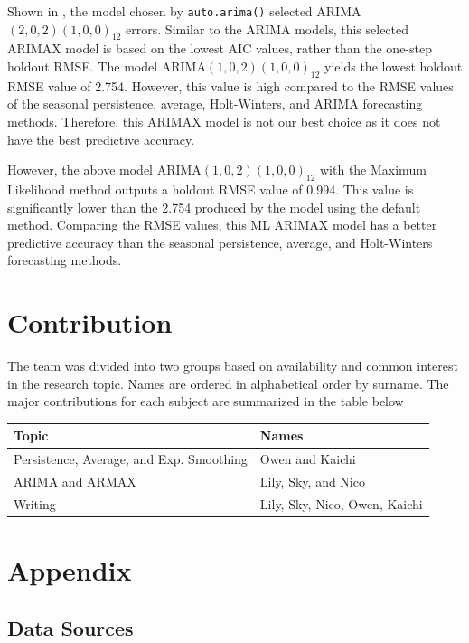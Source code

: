 \documentclass[]{article}
\begin{document}
Shown in , the model chosen by \texttt{auto.arima()} selected ARIMA$(2,0,2)(1,0,0)_12$ errors. Similar to the ARIMA models, this selected ARIMAX model is based on the lowest AIC values, rather than the one-step holdout RMSE. The model ARIMA$(1,0,2)(1,0,0)_12$ yields the lowest holdout RMSE value of 2.754. However, this value is high compared to the RMSE values of the seasonal persistence, average, Holt-Winters, and ARIMA forecasting methods. Therefore, this ARIMAX model is not our best choice as it does not have the best predictive accuracy. 

However, the above model ARIMA$(1,0,2)(1,0,0)_12$ with the Maximum Likelihood method outputs a holdout RMSE value of 0.994. This value is significantly lower than the 2.754 produced by the model using the default method. Comparing the RMSE values, this ML ARIMAX model has a better predictive accuracy than the seasonal persistence, average, and Holt-Winters forecasting methods.

\section{Contribution}

The team was divided into two groups based on availability and common interest in the research topic. Names are ordered in alphabetical order by surname. The major contributions for each subject are summarized in the table below

\begin{table}[H]
    \centering
    \captionsetup{justification=centering,margin=2cm}
    \begin{tabular}{|l|l|}
    \hline
        Topic & Names \\
    \hline\hline
    Persistence, Average, and Exp. Smoothing & Owen and Kaichi \\
    ARIMA and ARMAX & Lily, Sky, and Nico \\
    Writing & Lily, Sky, Nico, Owen, Kaichi \\
    \hline
   
    \end{tabular}
    \label{table:contribution}
\end{table}


\section{Appendix}

\subsection*{Data Sources}
\end{document}
